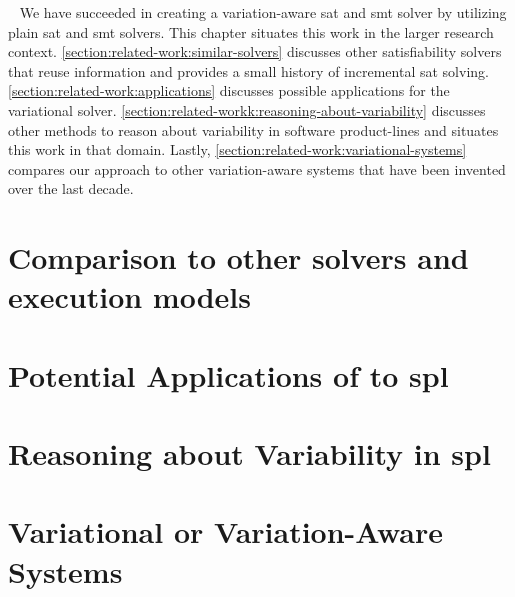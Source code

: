 ~\label{chapter:related-work}
%
We have succeeded in creating a variation-aware \ac{sat} and \ac{smt} solver by
utilizing plain \ac{sat} and \ac{smt} solvers. This chapter situates this work
in the larger research context. \autoref{section:related-work:similar-solvers}
discusses other satisfiability solvers that reuse information and provides a
small history of incremental \ac{sat} solving.
\autoref{section:related-work:applications} discusses possible applications for
the variational solver.
\autoref{section:related-workk:reasoning-about-variability} discusses other
methods to reason about variability in software product-lines and situates this
work in that domain. Lastly, \autoref{section:related-work:variational-systems}
compares our approach to other variation-aware systems that have been invented
over the last decade.
%
\section{Comparison to other solvers and execution models}

%
\section{Potential Applications of \vsat{} to \ac{spl}}

%
\section{Reasoning about Variability in \ac{spl}}

%
\section{Variational or Variation-Aware Systems}



